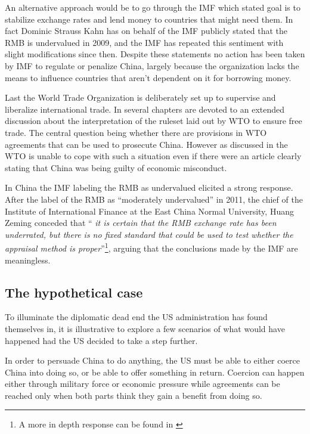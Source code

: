 An alternative approach would be to go through the IMF which stated goal 
is to stabilize exchange rates and lend money to countries that might 
need them. In fact Dominic Strauss Kahn has on behalf of the IMF 
publicly stated that the RMB is undervalued in 2009, and the IMF has 
repeated this sentiment with slight modifications since 
then\cite{reuters09}.  Despite these statements no action has been taken 
by IMF to regulate or penalize China, largely because the organization 
lacks the means to influence countries that aren't dependent on it for 
borrowing money.

Last the World Trade Organization is deliberately set up to supervise 
and liberalize international trade. In \cite{Evenett10} several chapters 
are devoted to an extended discussion about the interpretation of the 
ruleset laid out by WTO to ensure free trade. The central question being 
whether there are provisions in WTO agreements that can be used to 
prosecute China.  However as discussed in \cite{Levy11} the WTO is 
unable to cope with such a situation even if there were an article 
clearly stating that China was being guilty of economic misconduct.

In China the IMF labeling the RMB as undervalued elicited a strong 
response. After the label of the RMB as ``moderately undervalued'' in 
2011, the chief of the Institute of International Finance at the East 
China Normal University, Huang Zeming conceded that ``\textit{ it is 
	certain that the RMB exchange rate has been underrated, but there is 
	no fixed standard that could be used to test whether the appraisal 
method is proper}''\footnote{A more in depth response can be found in 
\cite{ChinaDaily11}}, arguing that the conclusions made by the IMF are 
meaningless.

\subsection{The hypothetical case}

To illuminate the diplomatic dead end the US administration has found 
themselves in, it is illustrative to explore a few scenarios of what 
would have happened had the US decided to take a step further.

In order to persuade China to do anything, the US must be able to either 
coerce China into doing so, or be able to offer something in return.  
Coercion can happen either through military force or economic pressure 
while agreements can be reached only when both parts think they gain a 
benefit from doing so.

